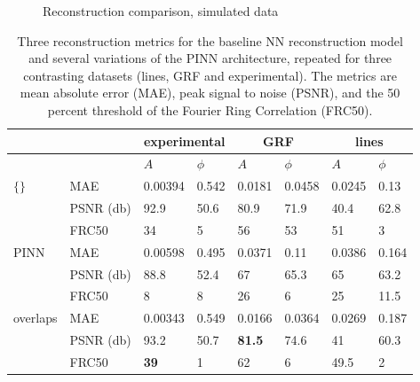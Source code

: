 \documentclass[sn-mathphys]{sn-jnl}%
\theoremstyle{thmstyleone}%
\theoremstyle{thmstyletwo}%
\theoremstyle{thmstylethree}%
\begin{document}
\begin{figure}
    \caption{Reconstruction comparison, simulated data}%
    \label{fig:sim_comparison}%
\end{figure}

\begin{table}[h]
\begin{center}
\caption{Three reconstruction metrics for the baseline NN reconstruction model and several variations of the PINN architecture, repeated for three contrasting datasets (lines, GRF and experimental). The metrics are mean absolute error (MAE), peak signal to noise (PSNR), and the 50 percent threshold of the Fourier Ring Correlation (FRC50). }\label{tab1}%
\begin{tabular}{p{2cm}l|ll|ll|ll}
\toprule 
    & \multicolumn{1}{c}{} & \multicolumn{2}{c}{experimental} & \multicolumn{2}{c}{GRF} & \multicolumn{2}{c}{lines}\\
    \midrule
    &
    & $A$ & $\phi$
    & $A$ & $\phi$
    & $A$ & $\phi$ \\
    \midrule
$\{\}$\footnotemark[1]    
& MAE & 0.00394 & 0.542 & 0.0181 & 0.0458 & 0.0245 & 0.13 \\
& PSNR (db) & 92.9  & 50.6 & 80.9 & 71.9 & 40.4 & 62.8 \\
& FRC50 & 34 & 5 & 56 & 53 & 51 & 3 \\
    \midrule
$\mathrm{PINN} $
& MAE & 0.00598 & 0.495 & 0.0371 & 0.11 & 0.0386 & 0.164 \\
& PSNR (db) & 88.8  & 52.4 & 67 & 65.3 & 65 & 63.2 \\
& FRC50 & 8 & 8 & 26 & 6 & 25 & 11.5 \\
    \midrule
overlaps
& MAE & 0.00343 & 0.549 & 0.0166 & 0.0364 & 0.0269 & 0.187 \\
& PSNR (db) & 93.2  & 50.7 & \textbf{81.5} & 74.6 & 41 & 60.3 \\
& FRC50 & \textbf{39} & 1 & 62 & 6 & 49.5 & 2 \\

\end{tabular}
\end{center}
\end{table}
\end{document}
